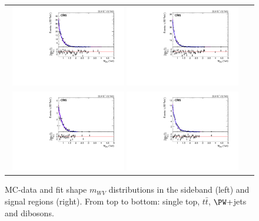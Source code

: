 \begin{figure}[htbp]
\begin{tabular}{cc}
	 \includegraphics[width=0.48\textwidth]{Plots/BackgroundEstimation/WV/m_lvj_fitting/WWTree_VJets_m_lvj_sb_loExpTail_with_pull.pdf}
	 \includegraphics[width=0.48\textwidth]{Plots/BackgroundEstimation/WV/m_lvj_fitting/WWTree_VJets_m_lvj_signal_regionExpTail_with_pull.pdf}\\
	 \includegraphics[width=0.48\textwidth]{Plots/BackgroundEstimation/WV/m_lvj_fitting/WWTree_VV_EWK_QCD_m_lvj_sb_loExpN_with_pull.pdf}
	 \includegraphics[width=0.48\textwidth]{Plots/BackgroundEstimation/WV/m_lvj_fitting/WWTree_VV_EWK_QCD_m_lvj_signal_regionExpTail_with_pull.pdf}
	 \end{tabular}
	 \caption{MC-data and fit shape $m_{WV}$ distributions in the sideband (left) and signal regions (right). From top to bottom: single top, $t\bar{t}$, $\PW+$jets and dibosons.}
	 \label{fig:mWW_1}
\end{figure}

